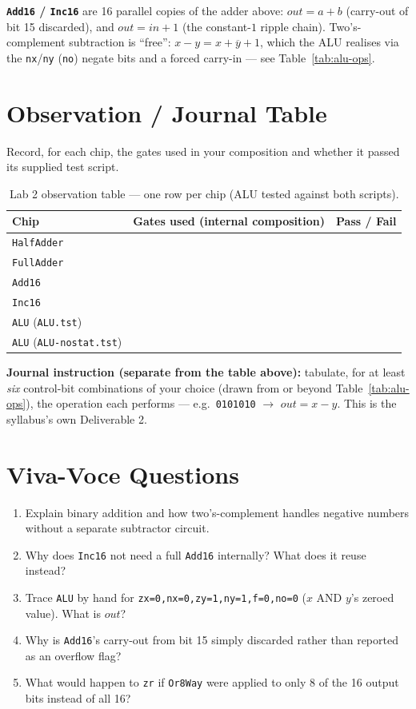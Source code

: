 \documentclass[11pt]{article}
\begin{document}
\noindent\textbf{\texttt{Add16} / \texttt{Inc16}} are 16 parallel copies of the adder above: $out = a+b$ (carry-out of bit 15 discarded), and $out = in+1$ (the constant-$1$ ripple chain). Two's-complement subtraction is ``free'': $x-y = x+\overline{y}+1$, which the ALU realises via the \texttt{nx}/\texttt{ny} (\texttt{no}) negate bits and a forced carry-in --- see Table~\ref{tab:alu-ops}.

\section{Observation / Journal Table}

Record, for each chip, the gates used in your composition and whether it passed its supplied test script.

\begin{table}[h]
\centering
\small
\begin{tabular}{@{}l l c@{}}
\toprule
Chip & Gates used (internal composition) & Pass / Fail \\
\midrule
\texttt{HalfAdder} & & \\
\texttt{FullAdder} & & \\
\texttt{Add16} & & \\
\texttt{Inc16} & & \\
\texttt{ALU} (\texttt{ALU.tst}) & & \\
\texttt{ALU} (\texttt{ALU-nostat.tst}) & & \\
\bottomrule
\end{tabular}
\caption{Lab 2 observation table --- one row per chip (ALU tested against both scripts).}
\label{tab:lab2-observations}
\end{table}

\noindent\textbf{Journal instruction (separate from the table above):} tabulate, for at least \emph{six} control-bit combinations of your choice (drawn from or beyond Table~\ref{tab:alu-ops}), the operation each performs --- e.g.\ \texttt{0101010} $\to$ $out = x - y$. This is the syllabus's own Deliverable 2.

\section{Viva-Voce Questions}

\begin{enumerate}
  \item Explain binary addition and how two's-complement handles negative numbers without a separate subtractor circuit.
  \item Why does \texttt{Inc16} not need a full \texttt{Add16} internally? What does it reuse instead?
  \item Trace \texttt{ALU} by hand for \texttt{zx=0,nx=0,zy=1,ny=1,f=0,no=0} ($x$ AND $y$'s zeroed value). What is $out$?
  \item Why is \texttt{Add16}'s carry-out from bit 15 simply discarded rather than reported as an overflow flag?
  \item What would happen to \texttt{zr} if \texttt{Or8Way} were applied to only 8 of the 16 output bits instead of all 16?
\end{enumerate}
\end{document}
